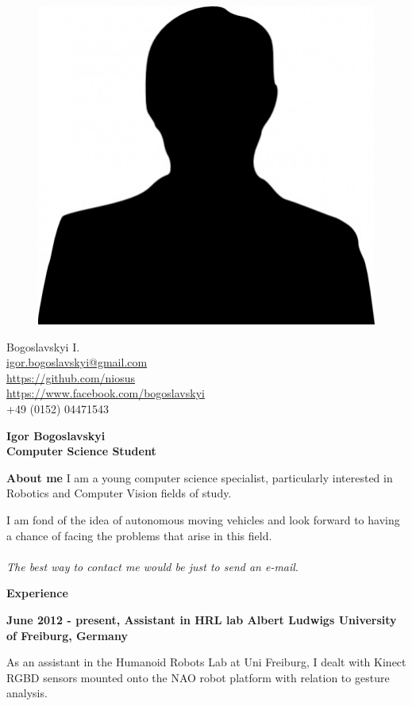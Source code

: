 \documentclass[a4paper,12pt,final]{memoir}
\newcommand{\Sep}{\vspace{1.5em}}
\newcommand{\SmallSep}{\vspace{0.5em}}
\newenvironment{AboutMe}
	{\ignorespaces\textbf{\color{Black} About me}}
	{\Sep\ignorespacesafterend}
\newcommand{\CVSection}[1]
	{\Large\textbf{#1}\par
	\SmallSep\normalsize\normalfont}
\newcommand{\CVItem}[1]
	{\textbf{\color{MidnightBlue} #1}}
\begin{document}
\begin{figure}
	\hfill
	\includegraphics[width=0.6\columnwidth]{photo.jpg}
	\vspace{-7cm}
\end{figure}

\begin{flushright}\small
	Bogoslavskyi I. \\
	\url{igor.bogoslavskyi@gmail.com}\\ 
	\SmallSep
	\url{https://github.com/niosus}\\ 
	\SmallSep
	\url{https://www.facebook.com/bogoslavskyi}\\ 
	\SmallSep
	+49 (0152) 04471543
\end{flushright}\normalsize
\framebreak


\Huge\bfseries {\color{MidnightBlue} Igor Bogoslavskyi} \\
\Large\bfseries  Computer Science Student \\

\normalsize\normalfont

\begin{AboutMe}
\newline 
I am a young computer science specialist, particularly interested in Robotics and Computer Vision fields of study. 

I am fond of the idea of autonomous moving vehicles and look forward to having a chance of facing the problems that arise in this field. \\
\\ \emph{The best way to contact me would be just to send an e-mail}.
\end{AboutMe}

\CVSection{Experience}
\CVItem{June 2012 - present, Assistant in HRL lab
\newline Albert Ludwigs University of Freiburg, Germany}
\begin{compactitem}[\color{RoyalBlue}$\circ$]
	\item As an assistant in the Humanoid Robots Lab at Uni Freiburg, I dealt with Kinect RGBD sensors mounted onto the NAO robot platform with relation to gesture analysis. 
\end{compactitem}
\SmallSep
\end{document}
